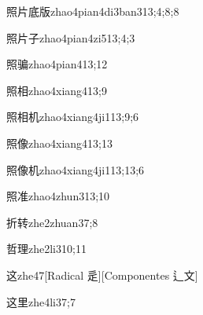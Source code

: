 \begin{verbete}{照片底版}{zhao4pian4di3ban3}{13;4;8;8}
\end{verbete}

\begin{verbete}{照片子}{zhao4pian4zi5}{13;4;3}
\end{verbete}

\begin{verbete}{照骗}{zhao4pian4}{13;12}
\end{verbete}

\begin{verbete}{照相}{zhao4xiang4}{13;9}
\end{verbete}

\begin{verbete}{照相机}{zhao4xiang4ji1}{13;9;6}
\end{verbete}

\begin{verbete}{照像}{zhao4xiang4}{13;13}
\end{verbete}

\begin{verbete}{照像机}{zhao4xiang4ji1}{13;13;6}
\end{verbete}

\begin{verbete}{照准}{zhao4zhun3}{13;10}
\end{verbete}

\begin{verbete}{折转}{zhe2zhuan3}{7;8}
\end{verbete}

\begin{verbete}{哲理}{zhe2li3}{10;11}
\end{verbete}

\begin{verbete}{这}{zhe4}{7}[Radical 辵][Componentes 辶文]
\end{verbete}

\begin{verbete}{这里}{zhe4li3}{7;7}
\end{verbete}

